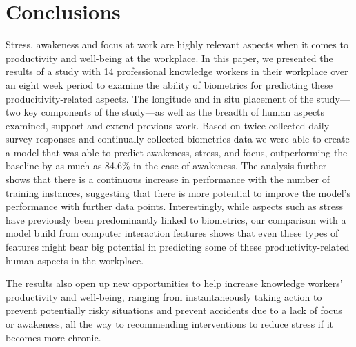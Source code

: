 \section{Conclusions} 
Stress, awakeness and focus at work are highly relevant aspects when it comes to productivity and well-being at the workplace. In this paper, we presented the results of a study with 14 professional knowledge workers in their workplace over an eight week period to examine the ability of biometrics for predicting these producitivity-related aspects. The longitude and in situ placement of the study---two key components of the study---as well as the breadth of human aspects examined, support and extend previous work. Based on twice collected daily survey responses and continually collected biometrics data we were able to create a model that was able to predict awakeness, stress, and focus, outperforming the baseline by as much as 84.6\% in the case of awakeness. The analysis further shows that there is a continuous increase in performance with the number of training instances, suggesting that there is more potential to improve the model's performance with further data points. Interestingly, while aspects such as stress have previously been predominantly linked to biometrics, our comparison with a model build from computer interaction features shows that even these types of features might bear big potential in predicting some of these productivity-related human aspects in the workplace. 

The results also open up new opportunities to help increase knowledge workers' productivity and well-being, ranging from instantaneously taking action to prevent potentially risky situations and prevent accidents due to a lack of focus or awakeness, all the way to recommending interventions to reduce stress if it becomes more chronic. 




